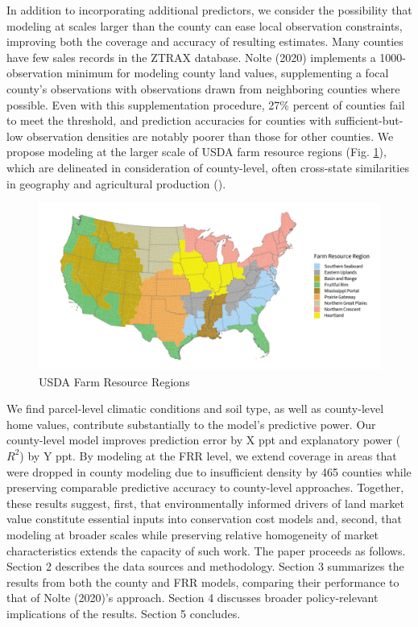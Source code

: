 \documentclass[12pt]{article}
\begin{document}
In addition to incorporating additional predictors, we consider the possibility that modeling at scales larger than the county can ease local observation constraints, improving both the coverage and accuracy of resulting estimates. Many counties have few sales records in the ZTRAX database. Nolte (2020) implements a 1000-observation minimum for modeling county land values, supplementing a focal county’s observations with observations drawn from neighboring counties where possible. Even with this supplementation procedure, 27\% percent of counties fail to meet the threshold, and prediction accuracies for counties with sufficient-but-low observation densities are notably poorer than those for other counties. We propose modeling at the larger scale of USDA farm resource regions (Fig. \ref{fig:frr_map}), which are delineated in consideration of county-level, often cross-state similarities in geography and agricultural production (\cite{FRR2000}).

\begin{figure}
    \centering
    \includegraphics[width=6in]{figures/FRR_map.png}
    \caption{USDA Farm Resource Regions}
    \label{fig:frr_map}
\end{figure}

We find parcel-level climatic conditions and soil type, as well as county-level home values, contribute substantially to the model's predictive power. Our county-level model improves prediction error by X ppt and explanatory power ($R^2$) by Y ppt. By modeling at the FRR level, we extend coverage in areas that were dropped in county modeling due to insufficient density by 465 counties while preserving comparable predictive accuracy to county-level approaches. Together, these results suggest, first, that environmentally informed drivers of land market value constitute essential inputs into conservation cost models and, second, that modeling at broader scales while preserving relative homogeneity of market characteristics extends the capacity of such work. The paper proceeds as follows. Section 2 describes the data sources and methodology. Section 3 summarizes the results from both the county and FRR models, comparing their performance to that of Nolte (2020)'s approach. Section 4 discusses broader policy-relevant implications of the results. Section 5 concludes.
\end{document}
